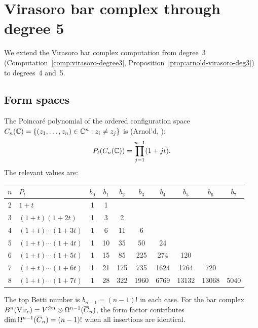 \section{Virasoro bar complex through degree 5}
\label{sec:virasoro-deg45}

We extend the Virasoro bar complex computation from degree~3
(Computation~\ref{comp:virasoro-degree3}, Proposition~\ref{prop:arnold-virasoro-deg3})
to degrees~4 and~5.

\subsection{Form spaces}

\begin{computation}
\label{comp:poincare-config}
The Poincar\'{e} polynomial of the ordered configuration space
$C_n(\mathbb{C}) = \{(z_1, \ldots, z_n) \in \mathbb{C}^n : z_i \neq z_j\}$
is (Arnol'd, \cite{Arnold69}):
\begin{equation}\label{eq:poincare-config}
P_t(C_n(\mathbb{C})) = \prod_{j=1}^{n-1}(1 + jt).
\end{equation}
The relevant values are:
\begin{center}
\renewcommand{\arraystretch}{1.15}
{\small
\begin{tabular}{c|l|cccccccc}
$n$ & $P_t$ & $b_0$ & $b_1$ & $b_2$ & $b_3$ & $b_4$ & $b_5$ & $b_6$ & $b_7$ \\
\hline
2 & $1 + t$ & 1 & 1 \\
3 & $(1+t)(1+2t)$ & 1 & 3 & 2 \\
4 & $(1+t)\cdots(1+3t)$ & 1 & 6 & 11 & 6 \\
5 & $(1+t)\cdots(1+4t)$ & 1 & 10 & 35 & 50 & 24 \\
6 & $(1+t)\cdots(1+5t)$ & 1 & 15 & 85 & 225 & 274 & 120 \\
7 & $(1+t)\cdots(1+6t)$ & 1 & 21 & 175 & 735 & 1624 & 1764 & 720 \\
8 & $(1+t)\cdots(1+7t)$ & 1 & 28 & 322 & 1960 & 6769 & 13132 & 13068 & 5040
\end{tabular}
}
\end{center}
The top Betti number is $b_{n-1} = (n-1)!$ in each case.
For the bar complex $\bar{B}^n(\mathrm{Vir}_c) = \bar{V}^{\otimes n}
\otimes \Omega^{n-1}(\overline{C}_n)$, the form factor
contributes $\dim \Omega^{n-1}(\overline{C}_n) = (n-1)!$
when all insertions are identical.
\end{computation}

